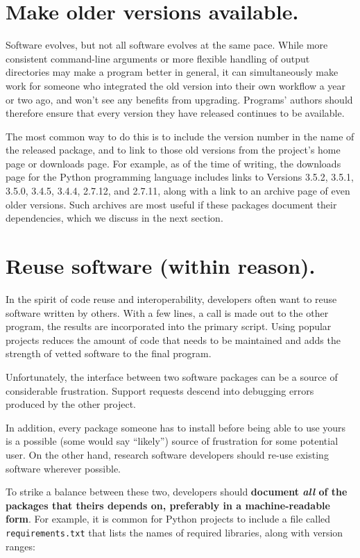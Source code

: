 \documentclass[10pt]{article}
\begin{document}
\section{Make older versions available.}

Software evolves, but not all software evolves at the same pace.
While more consistent command-line arguments
or more flexible handling of output directories
may make a program better in general,
it can simultaneously make work for someone
who integrated the old version into their own workflow a year or two ago,
and won't see any benefits from upgrading.
Programs' authors should therefore ensure that every version they have released
continues to be available.

The most common way to do this is to include the version number in the
name of the released package, and to link to those old versions from
the project's home page or downloads page.
For example,
as of the time of writing,
the downloads page for the Python programming language includes links to
Versions 3.5.2, 3.5.1, 3.5.0, 3.4.5, 3.4.4, 2.7.12, and 2.7.11,
along with a link to an archive page of even older versions.
Such archives are most useful if these packages document their dependencies,
which we discuss in the next section.

\section{Reuse software (within reason).}

In the spirit of code reuse and interoperability, developers often want
to reuse software written by others. 
With a few lines, a call
is made out to the other program, the results are incorporated into the
primary script. Using popular projects reduces the amount of code that
needs to be maintained and adds the strength of vetted software to the
final program.

Unfortunately, the interface between two software packages can be a
source of considerable frustration. Support requests descend into
debugging errors produced by the other project.

In addition, every package someone has to install
before being able to use yours is a
possible (some would say ``likely'') source of frustration for some
potential user. On the other hand, research software developers should
re-use existing software wherever possible.

To strike a balance between
these two, developers should
\textbf{document \emph{all} of the packages that theirs depends on, preferably in a machine-readable form}.
For example, it is common for Python projects to include a file called
\texttt{requirements.txt} that lists the names of required libraries,
along with version ranges:
\end{document}
